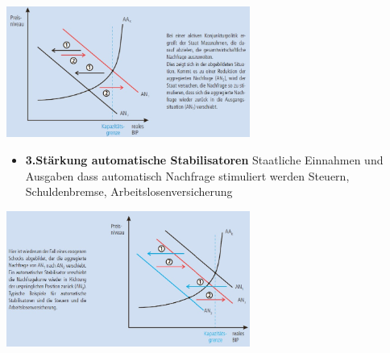 \begin{minipage}{8cm}
	\includegraphics[width=8cm]{images/keyne.jpg}
\end{minipage}
\begin{minipage}{11cm}
	\begin{itemize}
		\item \textbf{3.Stärkung automatische Stabilisatoren}
		\subitem Staatliche Einnahmen und Ausgaben dass automatisch Nachfrage stimuliert werden
		\subitem Steuern, Schuldenbremse, Arbeitslosenversicherung
	\end{itemize}
\end{minipage}
\begin{minipage}{8cm}
	\includegraphics[width=8cm]{images/autostab.jpg}
\end{minipage}

